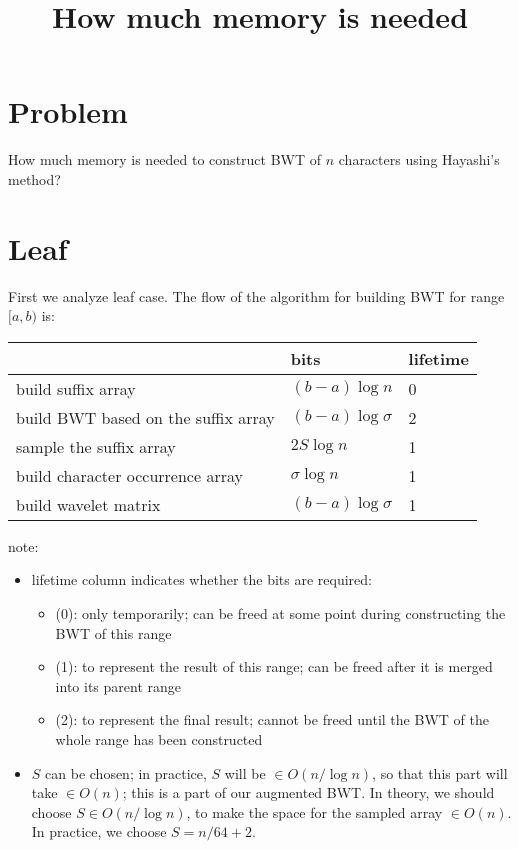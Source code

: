 \documentclass[12pt,dvipdfmx]{article}
\title{How much memory is needed}
\author{}
\date{}
\begin{document}
\maketitle

\section{Problem}
How much memory is needed to construct BWT of
$n$ characters using Hayashi's method?

\section{Leaf}
First we analyze leaf case.  
The flow of the algorithm for building BWT for range $[a,b)$ is:


\begin{center}
\begin{tabular}{|p{8cm}|l|l|}\hline
                                    & bits                  & lifetime \\\hline
build suffix array                  & $(b - a) \log n$      & 0 \\
build BWT based on the suffix array & $(b - a) \log \sigma$ & 2 \\
sample the suffix array             & $2S \log n$           & 1 \\
build character occurrence array    & $\sigma \log n$       & 1 \\
build wavelet matrix                & $(b - a) \log \sigma$ & 1 \\\hline
\end{tabular}
\end{center}

note:
\begin{itemize}
\item lifetime column indicates whether
  the bits are required:
  \begin{itemize}
  \item (0): only temporarily; can be freed at some point 
    during constructing the BWT of this range
  \item (1): to represent the result of this range; can be
    freed after it is merged into its parent range
  \item (2): to represent the final result; cannot be
    freed until the BWT of the whole range has been constructed
  \end{itemize}

\item $S$ can be chosen; 
  in practice, $S$ will be $\in O(n / \log n)$,
  so that this part will take $\in O(n)$;
  this is a part of our augmented BWT.
  In theory, we should choose $S \in O(n / \log n)$, 
  to make the space for the sampled array $\in O(n)$.
  In practice, we choose $S = n / 64 + 2$.
\end{itemize}
\end{document}
